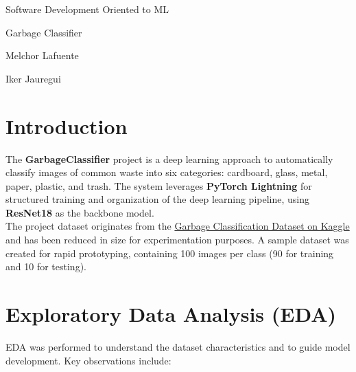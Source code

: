 \documentclass[12pt]{article}
\begin{document}

\begin{titlepage}
    \centering
    \vspace*{\fill}
    {\LARGE Software Development Oriented to ML \par}
    {\LARGE Garbage Classifier \par}
    \vspace{1cm}
    {\large Melchor Lafuente\par}
    {\large Iker Jauregui \par}
    \vspace*{\fill}
\end{titlepage}

\newpage

\section{Introduction}
The \textbf{GarbageClassifier} project is a deep learning approach to automatically classify images of common waste into six categories: cardboard, glass, metal, paper, plastic, and trash. The system leverages \textbf{PyTorch Lightning} for structured training and organization of the deep learning pipeline, using \textbf{ResNet18} as the backbone model.\\

The project dataset originates from the \href{https://www.kaggle.com/datasets/zlatan599/garbage-dataset-classification?resource=download}{Garbage Classification Dataset on Kaggle} and has been reduced in size for experimentation purposes. A sample dataset was created for rapid prototyping, containing 100 images per class (90 for training and 10 for testing).

\section{Exploratory Data Analysis (EDA)}
EDA was performed to understand the dataset characteristics and to guide model development. Key observations include:
\end{document}
